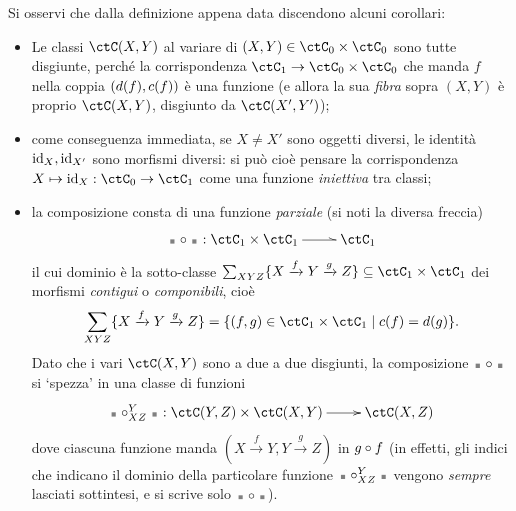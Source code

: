 \begin{remark}\label{cor_def_categ}
	Si osservi che dalla definizione appena data discendono alcuni corollari:
	\begin{itemize}
		\item Le classi \(\Hom{\ctC}(X,Y)\) al variare di \((X,Y)\in\ctC_0\times\ctC_0\) sono tutte disgiunte, perché la corrispondenza \(\ctC_1 \to \ctC_0\times\ctC_0\) che manda \(f\) nella coppia \((d(f),c(f))\) è una funzione (e allora la sua \emph{fibra} sopra \((X,Y)\) è proprio \(\Hom{\ctC}(X,Y)\), disgiunto da \(\Hom{\ctC}(X',Y')\));
		\item come conseguenza immediata, se \(X\ne X'\) sono oggetti diversi, le identità \(\mathrm{id}_X,\mathrm{id}_{X'}\) sono morfismi diversi: si può cioè pensare la corrispondenza \(X\mapsto \id_X : \ctC_0\to\ctC_1\) come una funzione \emph{iniettiva} tra classi;
		\item la composizione consta di una funzione \emph{parziale} (si noti la diversa freccia)
		      \[\xymatrix{\blank\cmp\blank : \ctC_1 \times \ctC_1 \ar@^{->}[r] & \ctC_1}\]
		      il cui dominio è la sotto-classe \(\sum_{XYZ} \{ X \xrightarrow f Y \xrightarrow g Z \}\subseteq\ctC_1 \times \ctC_1\) dei morfismi \emph{contigui} o \emph{componibili}, cioè
		      \[\sum_{XYZ} \{ X \xrightarrow f Y \xrightarrow g Z \} = \{(f,g)\in \ctC_1 \times \ctC_1\mid c(f)=d(g)\}.\]
		      Dato che i vari \(\Hom{\ctC}(X,Y)\) sono a due a due disgiunti, la composizione \(\blank\cmp\blank\) si `spezza' in una classe di funzioni
		      \[\xymatrix{\blank\cmp_{XZ}^Y\blank : \Hom{\ctC}(Y,Z)\times\Hom{\ctC}(X,Y) \ar[r] & \Hom{\ctC}(X,Z)}\]
		      dove ciascuna funzione manda \(( X \xrightarrow f Y, Y \xrightarrow g Z )\) in \(g\circ f\) (in effetti, gli indici che indicano il dominio della particolare funzione \(\blank\cmp_{XZ}^Y\blank\) vengono \emph{sempre} lasciati sottintesi, e si scrive solo \(\blank\cmp\blank\)).
	\end{itemize}
\end{remark}
